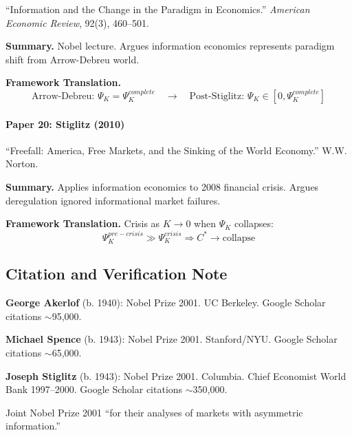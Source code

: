 ``Information and the Change in the Paradigm in Economics.''
\textit{American Economic Review}, 92(3), 460--501.

\textbf{Summary.}
Nobel lecture. Argues information economics represents paradigm shift 
from Arrow-Debreu world.

\textbf{Framework Translation.}
\begin{equation}
\text{Arrow-Debreu: } \Psi_K = \Psi_K^{complete} \quad \to \quad 
\text{Post-Stiglitz: } \Psi_K \in [0, \Psi_K^{complete}]
\end{equation}

\paragraph{Paper 20: Stiglitz (2010)}

``Freefall: America, Free Markets, and the Sinking of the World Economy.''
W.W. Norton.

\textbf{Summary.}
Applies information economics to 2008 financial crisis. Argues deregulation 
ignored informational market failures.

\textbf{Framework Translation.}
Crisis as $K \to 0$ when $\Psi_K$ collapses:
\begin{equation}
\Psi_K^{pre-crisis} \gg \Psi_K^{crisis} \Rightarrow C^* \to \text{collapse}
\end{equation}

\subsection{Citation and Verification Note}

\textbf{George Akerlof} (b. 1940): Nobel Prize 2001. UC Berkeley. 
Google Scholar citations $\sim$95,000.

\textbf{Michael Spence} (b. 1943): Nobel Prize 2001. Stanford/NYU. 
Google Scholar citations $\sim$65,000.

\textbf{Joseph Stiglitz} (b. 1943): Nobel Prize 2001. Columbia. 
Chief Economist World Bank 1997--2000. 
Google Scholar citations $\sim$350,000.

Joint Nobel Prize 2001 ``for their analyses of markets with asymmetric information.''




